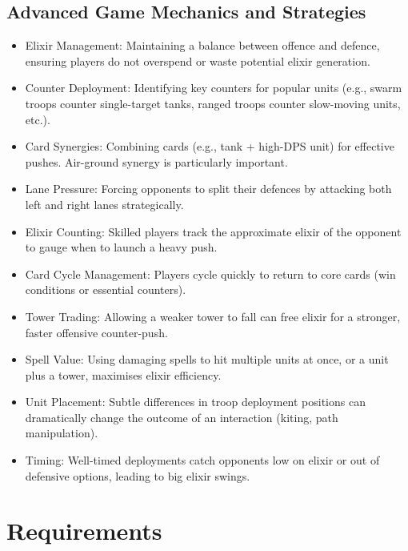 \documentclass{article}
\begin{document}
\subsection{Advanced Game Mechanics and Strategies}
\begin{itemize}
    \item Elixir Management: Maintaining a balance between offence and defence, ensuring players do not overspend or waste potential elixir generation.
    \item Counter Deployment: Identifying key counters for popular units (e.g., swarm troops counter single-target tanks, ranged troops counter slow-moving units, etc.).
    \item Card Synergies: Combining cards (e.g., tank + high-DPS unit) for effective pushes. Air-ground synergy is particularly important.
    \item Lane Pressure: Forcing opponents to split their defences by attacking both left and right lanes strategically.
    \item Elixir Counting: Skilled players track the approximate elixir of the opponent to gauge when to launch a heavy push.
    \item Card Cycle Management: Players cycle quickly to return to core cards (win conditions or essential counters).
    \item Tower Trading: Allowing a weaker tower to fall can free elixir for a stronger, faster offensive counter-push.
    \item Spell Value: Using damaging spells to hit multiple units at once, or a unit plus a tower, maximises elixir efficiency.
    \item Unit Placement: Subtle differences in troop deployment positions can dramatically change the outcome of an interaction (kiting, path manipulation).
    \item Timing: Well-timed deployments catch opponents low on elixir or out of defensive options, leading to big elixir swings.
\end{itemize}

\newpage

\section{Requirements}
\end{document}
